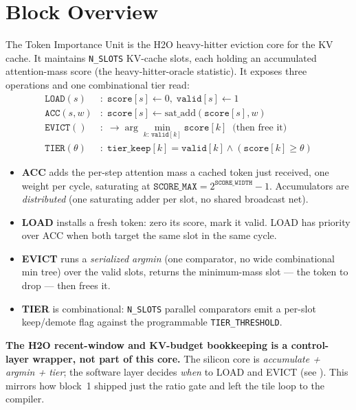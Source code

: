 \documentclass[11pt]{article}
\begin{document}
\section{Block Overview}
\label{sec:overview}

The Token Importance Unit is the H2O heavy-hitter eviction core for the KV cache.
It maintains \texttt{N\_SLOTS} KV-cache slots, each holding an accumulated
attention-mass score (the heavy-hitter-oracle statistic). It exposes three
operations and one combinational tier read:
\begin{align*}
\texttt{LOAD}(s)      &:\; \texttt{score}[s] \leftarrow 0,\; \texttt{valid}[s] \leftarrow 1 \\
\texttt{ACC}(s, w)    &:\; \texttt{score}[s] \leftarrow \mathrm{sat\_add}(\texttt{score}[s], w) \\
\texttt{EVICT}()      &:\; \rightarrow \arg\min_{k:\,\texttt{valid}[k]} \texttt{score}[k]\;\;\text{(then free it)} \\
\texttt{TIER}(\theta) &:\; \texttt{tier\_keep}[k] = \texttt{valid}[k] \wedge (\texttt{score}[k] \geq \theta)
\end{align*}

\begin{itemize}
\item \textbf{ACC} adds the per-step attention mass a cached token just received,
  one weight per cycle, saturating at $\texttt{SCORE\_MAX} = 2^{\texttt{SCORE\_WIDTH}}-1$.
  Accumulators are \emph{distributed} (one saturating adder per slot, no shared
  broadcast net).
\item \textbf{LOAD} installs a fresh token: zero its score, mark it valid. LOAD
  has priority over ACC when both target the same slot in the same cycle.
\item \textbf{EVICT} runs a \emph{serialized argmin} (one comparator, no wide
  combinational min tree) over the valid slots, returns the minimum-mass slot ---
  the token to drop --- then frees it.
\item \textbf{TIER} is combinational: \texttt{N\_SLOTS} parallel comparators emit
  a per-slot keep/demote flag against the programmable \texttt{TIER\_THRESHOLD}.
\end{itemize}

\medskip
\noindent\textbf{The H2O recent-window and KV-budget bookkeeping is a
control-layer wrapper, not part of this core.} The silicon core is
\emph{accumulate + argmin + tier}; the software layer decides \emph{when} to LOAD
and EVICT (see ). This mirrors
how block~1 shipped just the ratio gate and left the tile loop to the compiler.
\end{document}

